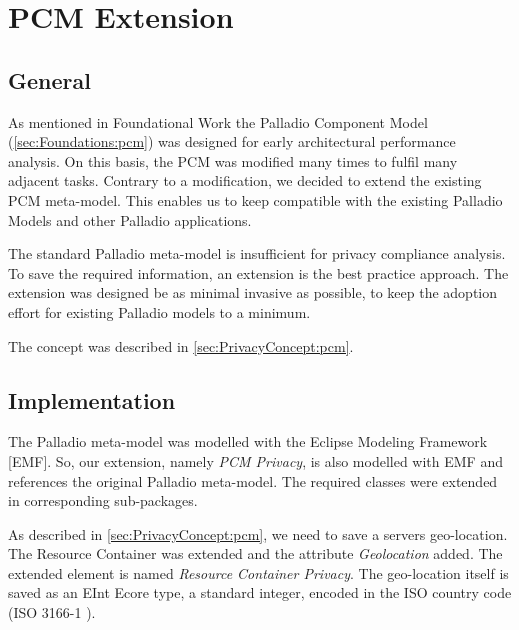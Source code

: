 
\chapter{PCM Extension}
\label{ch:pcmExtension}

\section{General}
\label{sec:pcmExtension:general}

As mentioned in Foundational Work the Palladio Component Model (\autoref{sec:Foundations:pcm}) was designed for early architectural performance analysis. On this basis, the PCM was modified many times to fulfil many adjacent tasks. Contrary to a modification, we decided to extend the existing PCM meta-model. This enables us to keep compatible with the existing Palladio Models and other Palladio applications.

The standard Palladio meta-model is insufficient for privacy compliance analysis. To save the required information, an extension is the best practice approach. The extension was designed be as minimal invasive as possible, to keep the adoption effort for existing Palladio models to a minimum.

The concept was described in \autoref{sec:PrivacyConcept:pcm}.


\section{Implementation}
\label{sec:pcmExtension:impl}

The Palladio meta-model was modelled with the Eclipse Modeling Framework [EMF]. So, our extension, namely \textit{PCM Privacy}, is also modelled with EMF and references the original Palladio meta-model. The required classes were extended in corresponding sub-packages.

As described in \autoref{sec:PrivacyConcept:pcm}, we need to save a servers geo-location. The Resource Container was extended and the attribute \textit{Geolocation} added. The extended element is named \textit{Resource Container Privacy}. The geo-location itself is saved as an EInt Ecore type, a standard integer, encoded in the ISO country code (ISO 3166-1 \cite{Wikipedia.ISO_3166}).

